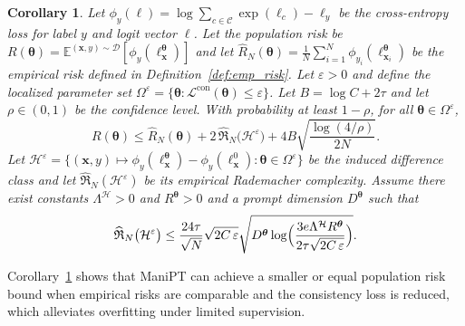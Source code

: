 \documentclass{article}
\theoremstyle{plain}
\newtheorem{corollary}[theorem]{Corollary}
\theoremstyle{definition}
\theoremstyle{remark}
\begin{document}
	\begin{corollary}\label{cor:gen_bound_main}
		Let $\phi_y(\boldsymbol{\ell})=\log\sum_{c\in \mathcal{C}}\exp(\ell_c)-\ell_y$ be the cross-entropy loss for label $y$ and logit vector $\boldsymbol{\ell}$.
		Let the population risk be $R(\boldsymbol{\theta})=\mathbb E^{(\mathbf{x},y)\sim \mathcal{D}}[\phi_y(\boldsymbol{\ell}^{\boldsymbol{\theta}}_{\mathbf{x}})]$ and let $\widehat R_{N}(\boldsymbol{\theta})=\frac1N\sum_{i=1}^N\phi_{y_i}(\boldsymbol{\ell}^{\boldsymbol{\theta}}_{\mathbf{x}_i})$ be the empirical risk defined in Definition~\ref{def:emp_risk}.
		Let $\varepsilon>0$ and define the localized parameter set $\Omega^{\varepsilon}=\{\boldsymbol{\theta}:\mathcal L^{\mathrm{con}}(\boldsymbol{\theta})\le \varepsilon\}$.
		Let $B=\log C+2\tau$ and let $\rho\in(0,1)$ be the confidence level.
		With probability at least $1-\rho$, for all $\boldsymbol{\theta}\in\Omega^{\varepsilon}$,
		\begin{equation*}
			R(\boldsymbol{\theta})
			\le
			\widehat R_{N}(\boldsymbol{\theta})
			+2\,\widehat{\mathfrak R}_{N}\bigl(\mathcal{H}^{\varepsilon}\bigr)
			+4B\sqrt{\frac{\log(4/\rho)}{2N}}.
		\end{equation*}
		Let $\mathcal{H}^{\varepsilon}=\{(\mathbf{x},y)\mapsto \phi_y(\boldsymbol{\ell}^{\boldsymbol{\theta}}_{\mathbf{x}})-\phi_y(\boldsymbol{\ell}^{0}_{\mathbf{x}}):\boldsymbol{\theta}\in\Omega^{\varepsilon}\}$ be the induced difference class and let $\widehat{\mathfrak R}_{N}(\mathcal{H}^{\varepsilon})$ be its empirical Rademacher complexity.
		Assume there exist constants $\Lambda^{\mathcal{H}}>0$ and $R^{\boldsymbol{\theta}}>0$ and a prompt dimension $D^{\boldsymbol{\theta}}$ such that
		\begin{equation*}
			\widehat{\mathfrak R}_{N}\bigl(\mathcal{H}^{\varepsilon}\bigr)
			\le
			\frac{24\tau}{\sqrt N}\sqrt{2C\,\varepsilon}
			\sqrt{D^{\boldsymbol{\theta}}\log\Bigl(\frac{3e\Lambda^{\mathcal{H}} R^{\boldsymbol{\theta}}}{2\tau\sqrt{2C\,\varepsilon}}\Bigr)}.
		\end{equation*}
	\end{corollary}
	Corollary~\ref{cor:gen_bound_main} shows that ManiPT can achieve a smaller or equal population risk bound when empirical risks are comparable and the consistency loss is reduced, which alleviates overfitting under limited supervision.
\end{document}
